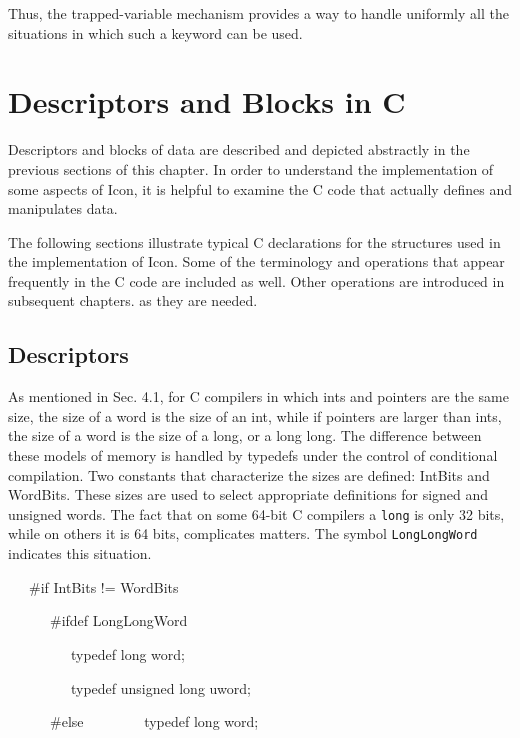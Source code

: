 Thus, the trapped-variable mechanism provides a way to handle
uniformly all the situations in which such a keyword can be used.

\section{Descriptors and Blocks in C}

Descriptors and blocks of data are described and depicted abstractly
in the previous sections of this chapter. In order to understand the
implementation of some aspects of Icon, it is helpful to examine the C
code that actually defines and manipulates data.

The following sections illustrate typical C declarations for the
structures used in the implementation of Icon. Some of the terminology
and operations that appear frequently in the C code are included as
well. Other operations are introduced in subsequent chapters. as they
are needed.

\subsection{Descriptors}

As mentioned in Sec. 4.1, for C compilers in which ints and pointers
are the same size, the size of a word is the size of an int, while if
pointers are larger than ints, the size of a word is the size of a
long, or a long long. The difference between these models of memory is
handled by typedefs under the control of conditional compilation. Two
constants that characterize the sizes are defined: IntBits and
WordBits. These sizes are used to select appropriate definitions for
signed and unsigned words. The fact that on some 64-bit C compilers a
\texttt{long} is only 32 bits, while on others it is 64 bits,
complicates matters. The symbol \texttt{LongLongWord} indicates this
situation.

\bigskip

{\ttfamily\mdseries
\ \ \ \#if IntBits != WordBits}

{\ttfamily\color[rgb]{0.0,0.0,0.8}
\ \ \ \ \ \ \#ifdef LongLongWord}

{\ttfamily\color[rgb]{0.0,0.0,0.8}
\ \ \ \ \ \ \ \ \ typedef long word;}

{\ttfamily\color[rgb]{0.0,0.0,0.8}
\ \ \ \ \ \ \ \ \ typedef unsigned long uword;}

{\ttfamily\mdseries
\textcolor[rgb]{0.0,0.0,0.8}{\ \ \ \ \ \ \#else\newline
} \ \ \ \ \ \ \ \ typedef long word;}

